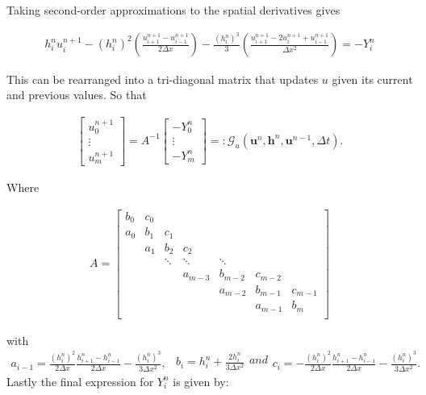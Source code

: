 \documentclass[SingleSpace,12pt,Proceedings]{Serre_ASCE}
\begin{document}
Taking second-order approximations to the spatial derivatives gives
\begin{linenomath*}
\begin{gather}
h^{n}_iu^{n+1}_i - \left(h^{n}_i\right)^2 \left(\frac{u^{n+1}_{i+1} -u^{n+1}_{i-1} }{2 \Delta x}\right) - \frac{\left(h^{n}_i\right)^3}{3}\left(\frac{u^{n+1}_{i+1} - 2u^{n+1}_{i} + u^{n+1}_{i-1} }{\Delta x^2}\right) = - Y^n_i 
\label{eq:expandedutdisc3}
\end{gather}
\end{linenomath*}
This can be rearranged into a tri-diagonal matrix that updates $u$ given its current and previous values. So that
\begin{linenomath*}
\begin{gather*}
\left[\begin{array}{c}
 u^{n+1}_0 \\
 \vdots \\
 u^{n+1}_m \end{array}\right]
 = A^{-1} \left[\begin{array}{c}
  -Y^n_0 \\
  \vdots \\
  -Y^n_m \end{array}\right] =: \mathcal{G}_u\left(\boldsymbol{u}^n,\boldsymbol{h}^n, \boldsymbol{u}^{n-1}, \Delta t \right).
\end{gather*}
\end{linenomath*}
Where
\begin{linenomath*}
\begin{gather*}
A =
\left[\begin{array}{ccccccccc}
 b_0 & c_0 &  & & & &  \\
 a_0 & b_1 & c_1 &  & & & \\
  & a_1 & b_2 & c_2 &  & &   \\
  &  &\ddots &\ddots &\ddots & & \\
  &  &  & a_{m-3} & b_{m-2} & c_{m-2} & \\
  &  &  &  & a_{m-2} & b_{m-1} & c_{m-1} \\
  &  &  & &  & a_{m-1} & b_{m}\\
  \end{array}\right]
\end{gather*}
\end{linenomath*}
with
\begin{subequations}
\begin{gather}
a_{i-1} = \frac{\left(h^n_i\right)^2}{2\Delta x}\frac{h^n_{i+1} - h^n_{i-1}}{2\Delta x} - \frac{\left(h^n_i\right)^3}{3 \Delta x^2}  ,
\label{eq:utriAa}
\end{gather}
\begin{gather}
b_i = h^n_i + \frac{2 h^n_i}{3 \Delta x^2}
\label{eq:utriAb}
\end{gather}
and
\begin{gather}
c_i = -\frac{\left(h^n_i\right)^2}{2\Delta x}\frac{h^n_{i+1} - h^n_{i-1}}{2\Delta x} - \frac{\left(h^n_i\right)^3}{3 \Delta x^2}.
\label{eq:utriAc}
\end{gather}
\end{subequations}
Lastly the final expression for $Y^n_i$ is given by:
\end{document}
